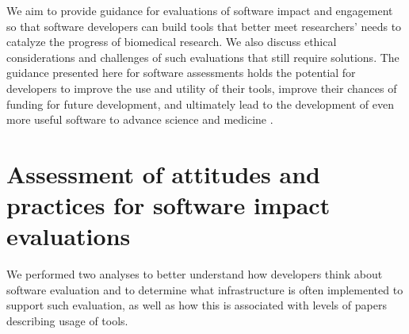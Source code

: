 \documentclass{article}
\begin{document}
We aim to provide guidance for evaluations of software impact and engagement so that software developers can build tools that better meet researchers' needs to catalyze the progress of biomedical research. We also discuss ethical considerations and challenges of such evaluations that still require solutions. The guidance presented here for software assessments holds the potential for developers to improve the use and utility of their tools, improve their chances of funding for future development, and ultimately lead to the development of even more useful software to advance science and medicine \cite{wratten_reproducible_2021}. 



\section{Assessment of attitudes and practices for software impact evaluations}

We performed two analyses to better understand how developers think about software evaluation and to determine what infrastructure is often implemented to support such evaluation, as well as how this is associated with levels of papers describing usage of tools. 
\end{document}
